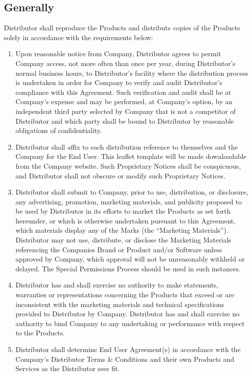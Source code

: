 \documentclass[letterpaper,10pt,english]{sphinxmanual}
\begin{document}
\subsection{Generally}
\label{\detokenize{distributionandpackaging:generally}}
Distributor shall reproduce the Products and distribute copies of the Products solely in accordance with the requirements below:
\begin{enumerate}
\item {} 
Upon reasonable notice from Company, Distributor agrees to permit Company access, not more often than once per year, during Distributor’s normal business hours, to Distributor’s facility where the distribution process is undertaken in order for Company to verify and audit Distributor’s compliance with this Agreement. Such verification and audit shall be at Company’s expense and may be performed, at Company’s option, by an independent third party selected by Company that is not a competitor of Distributor and which party shall be bound to Distributor by reasonable obligations of confidentiality.

\item {} 
Distributor shall affix to each distribution reference to themselves and the Company for the End User. This leaflet template will be made downloadable from the Company website. Such Proprietary Notices shall be conspicuous, and Distributor shall not obscure or modify such Proprietary Notices.

\item {} 
Distributor shall submit to Company, prior to use, distribution, or disclosure, any advertising, promotion, marketing materials, and publicity proposed to be used by Distributor in its efforts to market the Products as set forth hereunder, or which is otherwise undertaken pursuant to this Agreement, which materials display any of the Marks (the “Marketing Materials”). Distributor may not use, distribute, or disclose the Marketing Materials referencing the Companies Brand or Product and/or Software unless approved by Company, which approval will not be unreasonably withheld or delayed. The Special Permissions Process should be used in such instances.

\item {} 
Distributor has and shall exercise no authority to make statements, warranties or representations concerning the Products that exceed or are inconsistent with the marketing materials and technical specifications provided to Distributor by Company.  Distributor has and shall exercise no authority to bind Company to any undertaking or performance with respect to the Products.

\item {} 
Distributor shall determine End User Agreement(s) in accordance with the Company’s Distributor Terms \& Conditions and their own Products and Services as the Distributor sees fit.

\end{enumerate}
\end{document}
